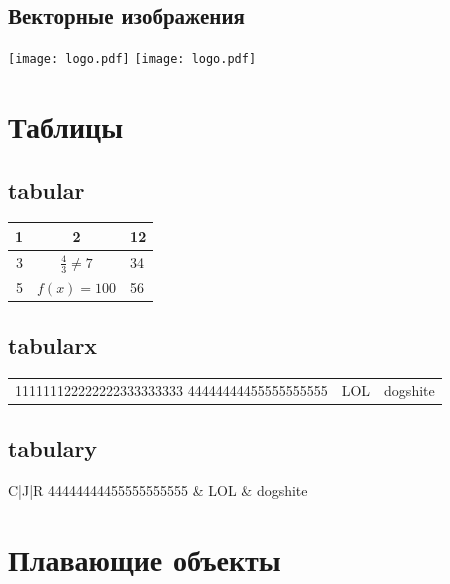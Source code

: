 \documentclass[a4paper,12pt]{article}
\begin{document}
\subsection{Векторные изображения}

\texttt{[image: logo.pdf]}
\texttt{[image: logo.pdf]}

\section{Таблицы}

\subsection{tabular}

\setlength{\extrarowheight}{5mm}
\begin{tabular}{|rc||p{4cm}|}
  \hline 1 & 2 & 12 \\
  \hline 3 & $\displaystyle \frac{4}{3} \ne 7$ & 34 \\ [1cm]
  5 & $f(x)=100$ & 56
\end{tabular}
\setlength{\extrarowheight}{0mm}

\subsection{tabularx}

\begin{tabularx}{\textwidth}{X|c|X}
  \hline 111111122222222333333333 44444444455555555555 & LOL & dogshite
\end{tabularx}

\subsection{tabulary}

\begin{tabulary}{\textwidth}{C|J|R}
   44444444455555555555 & LOL & dogshite
\end{tabulary}


\section{Плавающие объекты}
\end{document}
